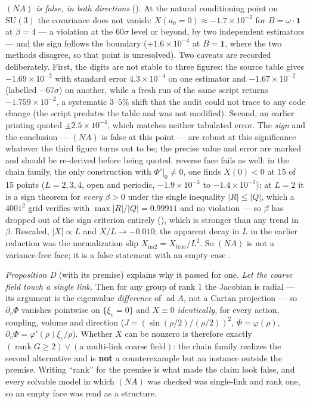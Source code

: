\emph{$(NA)$ is false, in both directions} (). At the natural conditioning
point on $\mathrm{SU}(3)$ the covariance does not vanish:
$X(a_0{=}0)\approx-1.7\times10^{-2}$ for $B=\omega\cdot\mathbf 1$ at $\beta=4$ --- a violation at the
$60\sigma$ level or beyond, by two independent estimators --- and the sign follows the boundary
($+1.6\times10^{-4}$ at $B=\mathbf 1$, where the two methods disagree, so that point is unresolved).
Two caveats are recorded deliberately. First, the digits are not stable to three figures: the source
table gives $-1.69\times10^{-2}$ with standard error $4.3\times10^{-4}$ on one estimator and
$-1.67\times10^{-2}$ (labelled $-67\sigma$) on another, while a fresh run of the same script returns
$-1.759\times10^{-2}$, a systematic $3$--$5\%$ shift that the audit could not trace to any code change
(the script predates the table and was not modified). Second, an earlier printing quoted
$\pm2.5\times10^{-4}$, which matches neither tabulated error. The \emph{sign} and the conclusion ---
$(NA)$ is false at this point --- are robust at this significance whatever the third figure turns out
to be; the precise value and error are marked \LE{} and should be re-derived before being quoted.
reverse face fails as well: in the chain family, the only construction with $\Phi'|_0\ne0$, one finds
$X(0)<0$ at 15 of 15 points ($L=2,3,4$, open and periodic, $-1.9\times10^{-3}$ to $-1.4\times10^{-2}$);
at $L=2$ it is a sign theorem for \emph{every} $\beta>0$ under the single inequality $\lvert R\rvert\le
\lvert Q\rvert$, which a $4001^2$ grid verifies with $\max\lvert R\rvert/\lvert Q\rvert=0.99911$ and no
violation --- so $\beta$ has dropped out of the sign criterion entirely (), which is
stronger than any trend in $\beta$. Rescaled, $\lvert X\rvert\propto L$ and $X/L\to-0.010$; the apparent
decay in $L$ in the earlier reduction was the normalization slip $X_{\mathrm{na2}}=X_{\mathrm{true}}/L^2$.
So $(NA)$ is not a variance-free face; it is a false statement with an empty case \LN.

\emph{Proposition D} \LT{} (with its premise) explains why it passed for one. \emph{Let the coarse field
touch a single link.} Then for any group of rank $1$ the Jacobian is radial --- its argument is the
eigenvalue \emph{difference} of $\operatorname{ad}A$, not a Cartan projection --- so $\partial_v\Phi$
vanishes pointwise on $\{\xi_v=0\}$ and $X\equiv0$ \emph{identically}, for every action, coupling,
volume and direction ($J=(\sin(\rho/2)/(\rho/2))^2$, $\Phi=\varphi(\rho)$,
$\partial_v\Phi=\varphi'(\rho)\xi_v/\rho$). Whether $X$ can be nonzero is therefore exactly
$(\operatorname{rank}G\ge2)\vee(\text{a multi-link coarse field})$: the chain family realizes the second
alternative and is \textbf{not} a counterexample but an instance outside the premise. Writing ``rank''
for the premise is what made the claim look false, and every solvable model in which $(NA)$ was checked
was single-link and rank one, so an empty face was read as a structure.

